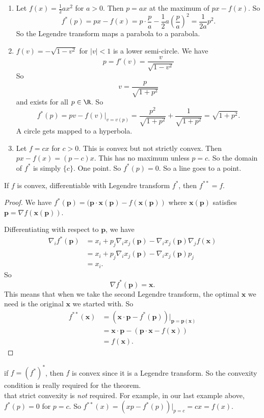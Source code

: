 \documentclass[a4paper]{article}
\begin{document}
\begin{eg}\leavevmode
  \begin{enumerate}
    \item Let $f(x) = \frac{1}{2}ax^2$ for $a > 0$. Then $p = ax$ at the maximum of $px - f(x)$. So
      \[
        f^*(p) = px - f(x) = p\cdot \frac{p}{a} - \frac{1}{2}a\left(\frac{p}{a}\right)^2 = \frac{1}{2a}p^2.
      \]
      So the Legendre transform maps a parabola to a parabola.
    \item $f(v) = -\sqrt{1 - v^2}$ for $|v| < 1$ is a lower semi-circle. We have
      \[
        p = f'(v) = \frac{v}{\sqrt{1 - v^2}}
      \]
      So
      \[
        v = \frac{p}{\sqrt{1 + p^2}}
      \]
      and exists for all $p\in \R$. So
      \[
        f^*(p) = pv - f(v)|_{v = v(p)} = \frac{p^2}{\sqrt{1 + p^2}} + \frac{1}{\sqrt{1 + p^2}} = \sqrt{1 + p^2}.
      \]
      A circle gets mapped to a hyperbola.
    \item Let $f = cx$ for $c > 0$. This is convex but not strictly convex. Then $px - f(x) = (p - c)x$. This has no maximum unless $p = c$. So the domain of $f^*$ is simply $\{c\}$. One point. So $f^*(p) = 0$. So a line goes to a point.
  \end{enumerate}
\end{eg}
\begin{thm}
  If $f$ is convex, differentiable with Legendre transform $f^*$, then $f^{**} = f$. 
\end{thm}

\begin{proof}
  We have $f^*(\mathbf{p}) = (\mathbf{p}\cdot\mathbf{x}(\mathbf{p}) - f(\mathbf{x}(\mathbf{p}))$ where $\mathbf{x}(\mathbf{p})$ satisfies $\mathbf{p} = \nabla f(\mathbf{x}(\mathbf{p}))$.

  Differentiating with respect to $\mathbf{p}$, we have
  \begin{align*}
    \nabla_i f^*(\mathbf{p}) &= x_i + p_j \nabla_i x_j (\mathbf{p}) - \nabla_i x_j(\mathbf{p}) \nabla_j f(\mathbf{x})\\
    &= x_i + p_j \nabla_i x_j(\mathbf{p}) - \nabla_i x_j(\mathbf{p}) p_j\\
    &= x_i.
  \end{align*}
  So
  \[
    \nabla f^*(\mathbf{p}) = \mathbf{x}.
  \]
  This means that when we take the second Legendre transform, the optimal $\mathbf{x}$ we need is the original $\mathbf{x}$ we started with. So
  \begin{align*}
    f^{**}(\mathbf{x}) &= (\mathbf{x} \cdot \mathbf{p} - f^*(\mathbf{p}))|_{\mathbf{p} = \mathbf{p}(\mathbf{x})}\\
    &= \mathbf{x}\cdot \mathbf{p} - (\mathbf{p}\cdot \mathbf{x} - f(\mathbf{x}))\\
    &= f(\mathbf{x}).
  \end{align*}
\end{proof}
\note if $f = (f^*)^*$, then $f$ is convex since it is a Legendre transform. So the convexity condition is really required for the theorem.\\
\note that strict convexity is \emph{not} required. For example, in our last example above, $f^*(p) = 0$ for $p = c$. So $f^{**}(x) = (xp - f^*(p))|_{p = c} = cx = f(x)$.
\end{document}
